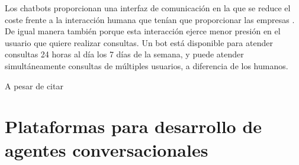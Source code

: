 Los chatbots proporcionan una interfaz de comunicación en la que se reduce el coste frente a la interacción humana que tenían que proporcionar las empresas \cite{Dans2016}. De igual manera también porque esta interacción ejerce menor presión en el usuario que quiere realizar consultas. Un bot está disponible para atender consultas 24 horas al día los 7 días de la semana, y puede atender simultáneamente consultas de múltiples usuarios, a diferencia de los humanos.

A pesar de citar 


\section{Plataformas para desarrollo de agentes conversacionales}
\label{sec:PlataformasChatbot}